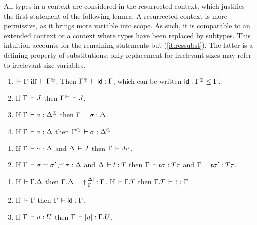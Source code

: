 \documentclass[acmsmall,screen]{acmart}\settopmatter{}
\begin{document}
All types in a context are considered in the resurrected context,
which justifies the first statement of the following lemma.
A resurrected context is more permissive, as it brings more variable
into scope.  As such, it is comparable to an extended context or a
context where types have been replaced by subtypes.  This intuition
accounts for the remaining statements but (\ref{it:ressubst}).  The
latter is a defining property of substitutions: only replacement for
irrelevant sizes may refer to irrelevant size variables.
\begin{lemma}[Resurrection]
\label{lem:res} \bla
\begin{enumerate}
\item \label{it:reswf} $\,\vdash \Gamma$ iff $\der \resurrect\Gamma$.
  Then $\resurrect \Gamma \der \sid : \Gamma$, which can be written
  $\sid : \resurrect\Gamma \leq \Gamma$.
\item If\/ $\Gamma \,\vdash J$ then $\resurrect \Gamma \der J$.
\item If\/ $\Gamma \der \sigma : \resurrect \Delta$ %
  then $\Gamma \,\vdash \sigma : \Delta$.
\item \label{it:ressubst} If\/ $\Gamma \,\vdash \sigma : \Delta$ %
  then $\resurrect\Gamma \der \sigma : \resurrect\Delta$.
\end{enumerate}
\end{lemma}

\begin{lemma}[Substitution]
\label{lem:sub}\bla
\begin{enumerate}
\item
  If\/ $\Gamma \,\vdash \sigma : \Delta$ and $\Delta \,\vdash J$ then $\Gamma \,\vdash J\sigma$.
\item
  If\/ $\Gamma \,\vdash \sigma = \sigma' \risingdotseq \tau : \Delta$ and $\Delta \,\vdash t : T$ then
  $\Gamma \,\vdash t\sigma : T\tau$ and $\Gamma \,\vdash t\sigma' : T\tau$.
\end{enumerate}
\end{lemma}

\begin{lemma}
\label{lem:specsub}\bla
\begin{enumerate}
\item If\/ $\,\vdash \Gamma. \Delta$ then $\Gamma. \Delta \,\vdash \mathord{\shortuparrow}_{|\Gamma|}^{|\Delta|} : \Gamma$.
      If\/ $\,\vdash \Gamma. T$ then $\Gamma. T \,\vdash \mathord{\shortuparrow} : \Gamma$.
\item If\/ $\,\vdash \Gamma$ then $\Gamma \,\vdash \mathsf{id} : \Gamma$.
\item If\/ $\Gamma \,\vdash u : U$ then $\Gamma \,\vdash [u] : \Gamma. U$.
\end{enumerate}
\end{lemma}
\end{document}
